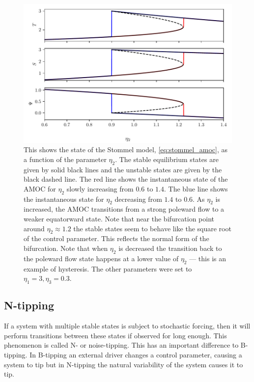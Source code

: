 \begin{figure}
  \centering
  \includegraphics[width=\textwidth,keepaspectratio]{stommel}
  \caption[The Stommel Model of the AMOC]{This shows the state of the Stommel model, \cref{eq:stommel_amoc}, as a function of the parameter $\eta_2$. 
    The stable equilibrium states are given by solid black lines and the unstable states are given by the black dashed line.
    The red line shows the instantaneous state of the AMOC for $\eta_2$ slowly increasing from $0.6$ to $1.4$. The blue line
    shows the instantaneous state for $\eta_2$ decreasing from $1.4$ to $0.6$.
    As $\eta_2$ is increased, the AMOC transitions from a strong poleward flow to a weaker equatorward state. Note that near the
    bifurcation point around $\eta_2 \approx 1.2$ the stable states seem to behave like the square root of the control parameter. This reflects the normal form of
    the bifurcation. Note that when $\eta_2$ is decreased the transition back to the poleward flow state happens at a lower value
    of $\eta_2$ --- this is an example of hysteresis. The other parameters were set to $\eta_1 = 3,\eta_3=0.3$.}
  \label{fig:stommel_amoc}
\end{figure}
\subsection{N-tipping}
If a system with multiple stable states is subject to stochastic forcing, then it will perform transitions between these states if observed for long enough. This
phenomenon is called N- or noise-tipping. This has an important difference to B-tipping. In B-tipping an external driver changes a control parameter, causing a system to tip
but in N-tipping the natural variability of the system causes it to tip.

